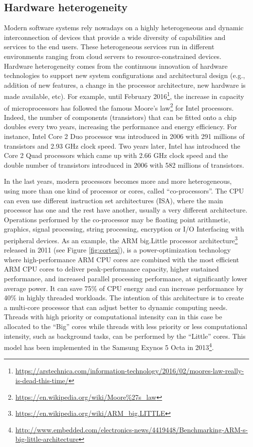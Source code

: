\subsection{Hardware heterogeneity}
Modern software systems rely nowadays on a highly heterogeneous and dynamic interconnection of devices that provide a wide diversity of capabilities and services to the end users.
These heterogeneous services run in different environments ranging from cloud servers to resource-constrained devices.
Hardware heterogeneity comes from the continuous innovation of hardware technologies to support new system configurations and architectural design (e.g., addition of new features, a change in the processor architecture, new hardware is made available, etc). 
For example, until February 2016\footnote{\url{https://arstechnica.com/information-technology/2016/02/moores-law-really-is-dead-this-time/}}, the increase in capacity of microprocessors has followed the famous Moore's law\footnote{\url{https://en.wikipedia.org/wiki/Moore\%27s_law}} for Intel processors. Indeed, the number of components (transistors) that can be fitted onto a chip doubles every two years, increasing the performance and energy efficiency.
For instance, Intel Core 2 Duo processor was introduced in 2006 with 291 millions of transistors and 2.93 GHz clock speed. Two years later, Intel has introduced the Core 2 Quad processors which came up with 2.66 GHz clock speed and the double number of transistors introduced in 2006 with 582 millions of transistors.

In the last years, modern processors becomes more and more heterogeneous, using more than one kind of processor or cores, called ``co-processors''. The CPU can even use different instruction set architectures (ISA), where the main processor has one and the rest have another, usually a very different architecture. Operations performed by the co-processor may be floating point arithmetic, graphics, signal processing, string processing, encryption or I/O Interfacing with peripheral devices. 
As an example, the ARM big.Little processor architecture\footnote{\url{https://en.wikipedia.org/wiki/ARM_big.LITTLE}} released in 2011 (see Figure \ref{fig:cortex}), is a power-optimization technology where high-performance ARM CPU cores are combined with the most efficient ARM CPU cores to deliver peak-performance capacity, higher sustained performance, and increased parallel processing performance, at significantly lower average power. It can save 75\% of CPU energy and can increase performance by 40\% in highly threaded workloads.
The intention of this architecture is to create a multi-core processor that can adjust better to dynamic computing needs.
Threads with high priority or computational intensity can in this case be allocated to the ``Big'' cores while threads with less priority or less computational intensity, such as background tasks, can be performed by the ``Little'' cores. This model has been implemented in the Samsung Exynos 5 Octa in 2013\footnote{\url{http://www.embedded.com/electronics-news/4419448/Benchmarking-ARM-s-big-little-architecture}}.



